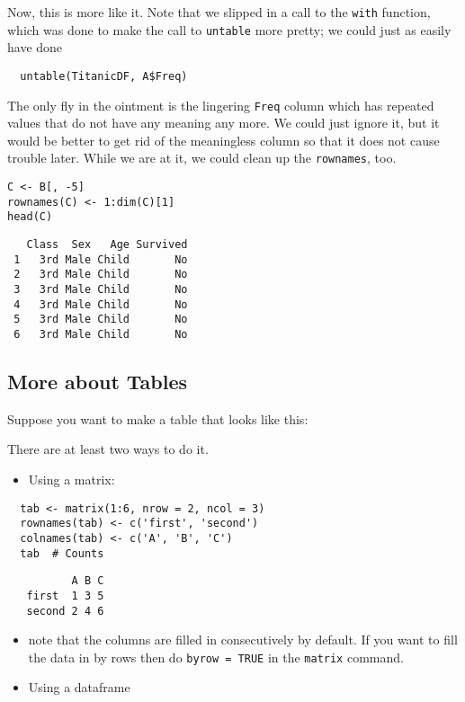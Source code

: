 \documentclass[captions=tableheading]{scrbook}
\begin{document}
Now, this is more like it. Note that we slipped in a call to the \texttt{with} function, which was done to make the call to \texttt{untable} more pretty; we could just as easily have done
\begin{verbatim}
  untable(TitanicDF, A$Freq)
\end{verbatim}


The only fly in the ointment is the lingering \texttt{Freq} column which has repeated values that do not have any meaning any more. We could just ignore it, but it would be better to get rid of the meaningless column so that it does not cause trouble later. While we are at it, we could clean up the \texttt{rownames}, too.


\begin{verbatim}
C <- B[, -5]
rownames(C) <- 1:dim(C)[1]
head(C)
\end{verbatim}

\begin{verbatim}
   Class  Sex   Age Survived
 1   3rd Male Child       No
 2   3rd Male Child       No
 3   3rd Male Child       No
 4   3rd Male Child       No
 5   3rd Male Child       No
 6   3rd Male Child       No
\end{verbatim}
\subsection{More about Tables}
\label{sec-5-1-6}

Suppose you want to make a table that looks like this:

There are at least two ways to do it.

\begin{itemize}
\item Using a matrix:
\end{itemize}

\begin{verbatim}
  tab <- matrix(1:6, nrow = 2, ncol = 3)
  rownames(tab) <- c('first', 'second')
  colnames(tab) <- c('A', 'B', 'C')
  tab  # Counts
\end{verbatim}

\begin{verbatim}
          A B C
   first  1 3 5
   second 2 4 6
\end{verbatim}

\begin{itemize}
\item note that the columns are filled in consecutively by default. If you want to fill the data in by rows then do \texttt{byrow = TRUE} in the \texttt{matrix} command.
\item Using a dataframe
\end{itemize}
\end{document}
